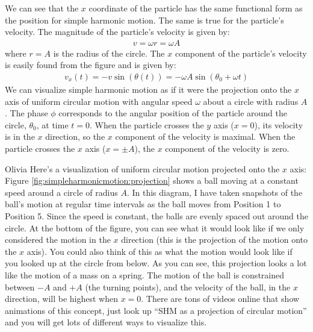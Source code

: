 We can see that the $x$ coordinate of the particle has the same functional form as the position for simple harmonic motion. The same is true for the particle's velocity. The magnitude of the particle's velocity is given by:
\begin{align*}
v = \omega r = \omega A
\end{align*}
where $r=A$ is the radius of the circle. The $x$ component of the particle's velocity is easily found from the figure and is given by:
\begin{align*}
v_x(t) = -v\sin(\theta(t)) = -\omega A\sin(\theta_0 + \omega t)
\end{align*}
We can visualize simple harmonic motion as if it were the projection onto the $x$ axis of uniform circular motion with angular speed $\omega$ about a circle with radius $A$. The phase $\phi$ corresponds to the angular position of the particle around the circle, $\theta_0$, at time $t=0$. When the particle crosses the $y$ axis ($x=0$), its velocity is in the $x$ direction, so the $x$ component of the velocity is maximal. When the particle crosses the $x$ axis ($x=\pm A$), the $x$ component of the velocity is zero.
\vspace{-0.25cm}
\begin{studentOpinion}{Olivia}
Here's a visualization of uniform circular motion projected onto the $x$ axis:
Figure \ref{fig:simpleharmonicmotion:projection} shows a ball moving at a constant speed around a circle of radius $A$. In this diagram, I have taken snapshots of the ball's motion at regular time intervals as the ball moves from Position 1 to Position 5. Since the speed is constant, the balls are evenly spaced out around the circle. At the bottom of the figure, you can see what it would look like if we only considered the motion in the $x$ direction (this is the projection of the motion onto the $x$ axis). You could also think of this as what the motion would look like if you looked up at the circle from below. As you can see, this projection looks a lot like the motion of a mass on a spring. The motion of the ball is constrained between $-A$ and $+A$ (the turning points), and the velocity of the ball, in the $x$ direction, will be highest when $x=0$. There are tons of videos online that show animations of this concept, just look up ``SHM as a projection of circular motion'' and you will get lots of different ways to visualize this.
\end{studentOpinion}

